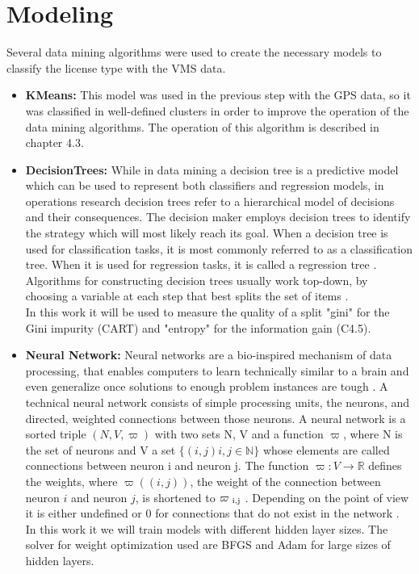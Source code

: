 \section{Modeling} %
\label{sub:modeling}
Several data mining algorithms were used to create the necessary models to classify the license type with the VMS data.
\begin{itemize}
\item \textbf{ KMeans:} This model was used in the previous step with the GPS data, so it was classified in well-defined clusters in order to improve the operation of the data mining algorithms. The operation of this algorithm is described in chapter 4.3.

\item \textbf{ DecisionTrees: }
While in data mining a decision tree is a predictive model which can be used to represent both classifiers and regression models, in operations research decision trees refer to a hierarchical model of decisions and their consequences. The decision maker employs decision trees to identify the strategy which will most likely reach its goal. When a decision tree is used for classification tasks, it is most commonly referred to as a classification tree. When it is used for regression tasks, it is called a regression tree \cite{Rokach2014}.
Algorithms for constructing decision trees usually work top-down, by choosing a variable at each step that best splits the set of items \cite{ApplicationsReviews}.\\
In this work it will be used to measure the quality of a split "gini" for the Gini impurity (CART)\cite{DTAnalysis} and "entropy" for the information gain (C4.5)\cite{DTAnalysis}.

\item \textbf{Neural Network: }
Neural networks are a bio-inspired mechanism of data processing, that enables computers to learn technically similar to a brain and even generalize once solutions to enough problem instances are tough \cite{Kriesel2007NeuralNetworks}. A technical neural network consists of simple processing units, the neurons, and directed, weighted connections between those neurons. A neural network is a sorted triple $(N, V, \varpi )$ with two sets N, V and a  function $\varpi$, where N is the set of neurons and V a set $\{ (i, j) i, j \in \mathbb{N} \}$  whose elements are called connections between neuron i and neuron j. The function $ \varpi : V \rightarrow \mathbb{R}$ defines the weights, where $\varpi((i, j))$, the weight of the connection between neuron $i$ and neuron $j$, is shortened to $\varpi \textsubscript{ i,j}$ . Depending on the point of view it is either undefined or 0 for connections that do not exist in the network \cite{Kriesel2007NeuralNetworks}.  \\
In this work it we will train models with different hidden layer sizes. The solver for weight optimization used are BFGS\cite{Dai2013} and Adam\cite{adamNN} for large sizes of hidden layers.


\end{itemize}

